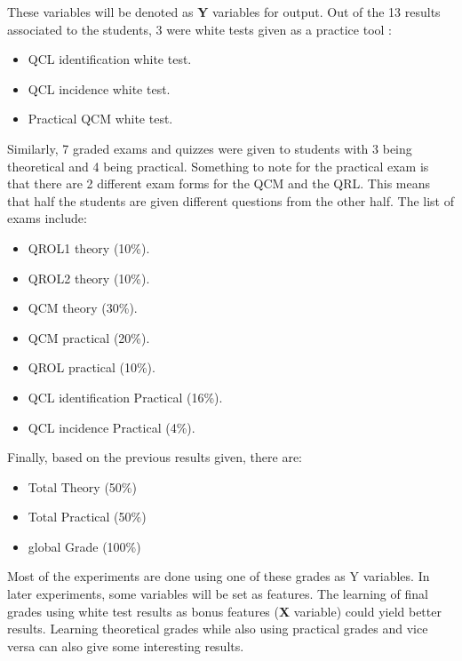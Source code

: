 \documentclass[a4paper,11pt]{report}
\numberwithin{figure}{section} %
\begin{document}
    These variables will be denoted as \textbf{Y} variables for output.
    Out of the 13 results associated to the students, 3 were white tests given as a practice tool : 
    \begin{itemize}
    \item[\textbullet]  QCL identification white test.
	\item[\textbullet]  QCL incidence white test.
	\item[\textbullet]  Practical QCM white test.
    \end{itemize}
    Similarly, 7 graded exams and quizzes were given to students with 3 being theoretical and 4 being practical. Something to note for the practical exam is that there are 2 different exam forms for the QCM and the QRL. This means that half the students are given different questions from the other half. The list of exams include:
    \begin{itemize}
    \item[\textbullet]  QROL1 theory (10\%).
    \item[\textbullet]  QROL2 theory (10\%).
    \item[\textbullet]  QCM theory (30\%).
    \item[\textbullet]  QCM practical (20\%).
    \item[\textbullet]  QROL practical (10\%).
    \item[\textbullet]  QCL identification Practical (16\%).
    \item[\textbullet]  QCL incidence Practical (4\%).
    \end{itemize}
    Finally, based on the previous results given, there are:
    \begin{itemize}
    \item[\textbullet] Total Theory (50\%)
    \item[\textbullet] Total Practical (50\%)
    \item[\textbullet] global Grade (100\%)
    \end{itemize}
    
    Most of the experiments are done using one of these grades as Y variables. In later experiments, some variables will be set as features. The learning of final grades using white test results as bonus features (\textbf{X} variable) could yield better results. Learning theoretical grades while also using practical grades and vice versa can also give some interesting results. \\
    
\end{document}
